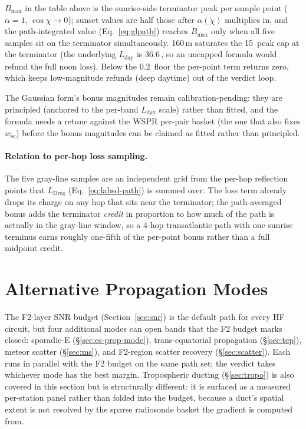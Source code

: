 \documentclass[11pt,a4paper]{article}
\newcommand{\SI}[2]{#1\,\text{#2}}
\newcommand{\dB}{\text{dB}}
\begin{document}
\noindent
$B_{\max}$ in the table above is the sunrise-side terminator
peak per sample point ($\alpha = 1$, $\cos\chi \to 0$); sunset
values are half
those after $\alpha(\dot\chi)$ multiplies in, and the
path-integrated value (Eq.~\ref{eq:glpath}) reaches $B_{\max}$
only when all five samples sit on the terminator
simultaneously.  160\,m saturates
the \SI{15}{\dB} peak cap at the terminator (the underlying
$L_{\text{day}}$ is \SI{36.6}{\dB}, so an uncapped formula
would refund the full noon loss).
Below the \SI{0.2}{\dB} floor the per-point term returns zero,
which keeps low-magnitude refunds (deep daytime) out of the
verdict loop.

The Gaussian form's bonus magnitudes remain
calibration-pending: they are principled (anchored to the
per-band $L_{\text{day}}$ scale) rather than fitted, and the
formula needs a retune against the WSPR
per-pair basket (the one that also fixes $w_{\text{sc}}$)
before the bonus
magnitudes can be claimed as fitted rather than principled.

\paragraph{Relation to per-hop loss sampling.}  The five
gray-line samples are an independent grid from the per-hop
reflection points that $L_{\text{Dreg}}$
(Eq.~\ref{eq:labsd-path}) is summed over.  The loss term already
drops its charge on any hop that sits near the terminator; the
path-averaged bonus adds the terminator \emph{credit} in proportion to how
much of the path is actually in the gray-line window, so a 4-hop
transatlantic path with one sunrise terminus earns roughly
one-fifth of the per-point bonus rather than a full midpoint
credit.

\section{Alternative Propagation Modes}\label{sec:altprop}

The F2-layer SNR budget (Section~\ref{sec:snr}) is the default path
for every HF circuit, but four additional modes can open bands that
the F2 budget marks closed: sporadic-E (\S\ref{sec:es-prop-mode}),
trans-equatorial propagation (\S\ref{sec:tep}), meteor scatter
(\S\ref{sec:ms}), and F2-region scatter recovery
(\S\ref{sec:scatter}).  Each runs in parallel with the F2 budget on
the same path set; the verdict takes whichever mode has the best
margin.  Tropospheric ducting (\S\ref{sec:tropo}) is also covered
in this section but is structurally different: it is surfaced as
a measured per-station panel rather than folded into the budget,
because a duct's spatial extent is not resolved by the sparse
radiosonde basket the gradient is computed from.
\end{document}
